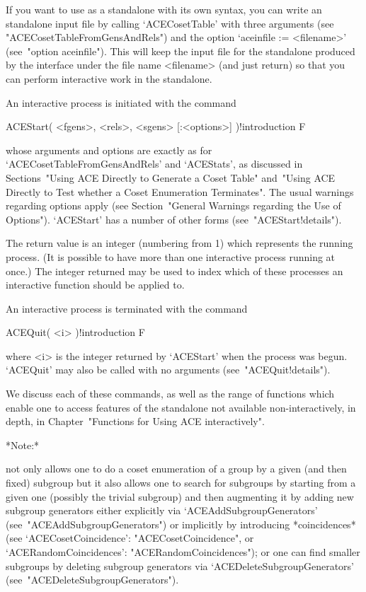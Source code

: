 If you want to use {\ACE} as a standalone with its own syntax, you can
write an {\ACE} standalone input file by calling `ACECosetTable'  with
three arguments (see "ACECosetTableFromGensAndRels")  and  the  option
`aceinfile := <filename>' (see~"option aceinfile"). This will keep the
input file for the {\ACE} standalone produced by the {\GAP}  interface
under the file name <filename> (and  just  return)  so  that  you  can
perform interactive work in the standalone.


An interactive {\ACE} process is initiated with the command

\>ACEStart( <fgens>, <rels>, <sgens> [:<options>] )!{introduction} F

whose    arguments    and    options    are     exactly     as     for
`ACECosetTableFromGensAndRels'  and  `ACEStats',   as   discussed   in
Sections~"Using ACE Directly to Generate a Coset Table" and~"Using ACE
Directly to Test whether a Coset Enumeration  Terminates".  The  usual
warnings  regarding  options  apply  (see  Section~"General   Warnings
regarding the Use of Options"). `ACEStart' has a number of other forms
(see~"ACEStart!details").

The return value is an integer (numbering from 1) which represents the
running process. (It is possible to have  more  than  one  interactive
process running at once.) The integer returned may be  used  to  index
which of these processes an  interactive  {\ACE}  function  should  be
applied to.

An interactive {\ACE} process is terminated with the command

\>ACEQuit( <i> )!{introduction} F

where <i> is the integer returned by `ACEStart' when the  process  was
begun.   `ACEQuit'   may   also   be   called   with   no    arguments
(see~"ACEQuit!details").

We discuss each of these commands, as well as the range  of  functions
which enable one to access  features  of  the  {\ACE}  standalone  not
available non-interactively, in depth, in Chapter~"Functions for Using
ACE interactively".

*Note:*

{\ACE} not only allows one to do a coset enumeration of a group  by  a
given (and then fixed) subgroup but it also allows one to  search  for
subgroups by starting from a given one (possibly the trivial subgroup)
and then augmenting  it  by  adding  new  subgroup  generators  either
explicitly               via                `ACEAddSubgroupGenerators'
(see~"ACEAddSubgroupGenerators")   or   implicitly   by    introducing
*coincidences* (see `ACECosetCoincidence':  "ACECosetCoincidence",  or
`ACERandomCoincidences': "ACERandomCoincidences");  or  one  can  find
smaller   subgroups    by    deleting    subgroup    generators    via
`ACEDeleteSubgroupGenerators' (see~"ACEDeleteSubgroupGenerators").

